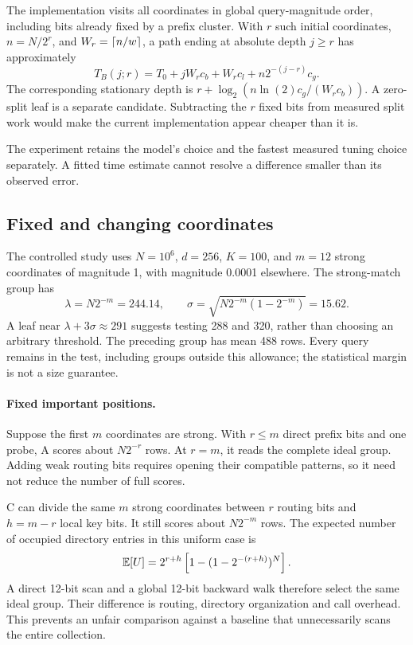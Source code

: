The implementation visits all coordinates in global query-magnitude order, including bits
already fixed by a prefix cluster. With $r$ such initial coordinates, $n=N/2^r$, and
$W_r=\left\lceil n/w\right\rceil$, a path ending at absolute depth $j\ge r$ has approximately
\[
 T_B(j;r)=T_0+jW_rc_b+W_rc_l+n2^{-(j-r)}c_g.
\]
The corresponding stationary depth is $r+\log_2(n\ln(2)c_g/(W_rc_b))$. A zero-split leaf is
a separate candidate. Subtracting the $r$ fixed bits from measured split work would make
the current implementation appear cheaper than it is.

The experiment retains the model's choice and the fastest measured tuning choice separately.
A fitted time estimate cannot resolve a difference smaller than its observed error.

\newpage
\subsection{Fixed and changing coordinates}
The controlled study uses $N=10^6$, $d=256$, $K=100$, and $m=12$ strong coordinates of
magnitude 1, with magnitude 0.0001 elsewhere. The strong-match group has
\[
 \lambda=N2^{-m}=244.14,\qquad
 \sigma=\sqrt{N2^{-m}(1-2^{-m})}=15.62.
\]
A leaf near $\lambda+3\sigma\approx291$ suggests testing 288 and 320, rather than choosing an
arbitrary threshold. The preceding group has mean 488 rows. Every query remains in the test,
including groups outside this allowance; the statistical margin is not a size guarantee.

\paragraph{Fixed important positions.} Suppose the first $m$ coordinates are strong. With
$r\le m$ direct prefix bits and one probe, A scores about $N2^{-r}$ rows. At $r=m$, it reads
the complete ideal group. Adding weak routing bits requires opening their compatible
patterns, so it need not reduce the number of full scores.

C can divide the same $m$ strong coordinates between $r$ routing bits and $h=m-r$ local
key bits. It still scores about $N2^{-m}$ rows. The expected number of occupied directory
entries in this uniform case is
\begin{equation}
 \mathbb E[U]=2^{r+h}\left[1-(1-2^{-(r+h)})^N\right].
\end{equation}
A direct 12-bit scan and a global 12-bit backward walk therefore select the same ideal group.
Their difference is routing, directory organization and call overhead. This prevents an
unfair comparison against a baseline that unnecessarily scans the entire collection.

